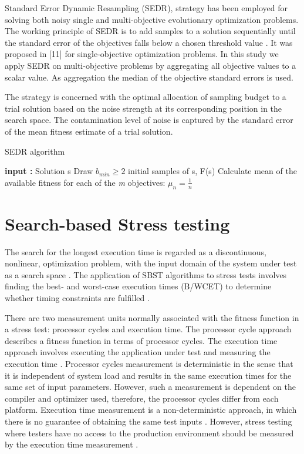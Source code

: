 \documentclass{report}
\begin{document}
Standard Error Dynamic Resampling (SEDR), strategy has been employed for solving both noisy single and multi-objective evolutionary
optimization problems. The working principle of SEDR is to add samples to a solution sequentially until the standard error of
the objectives falls below a chosen threshold value \cite{Siegmund2013}. It was proposed in [11] for single-objective optimization problems. In this study we apply SEDR on multi-objective problems by aggregating all objective values to a scalar value. As aggregation the median of the objective standard errors is used.


The strategy is concerned with the optimal allocation of sampling budget to a trial solution based on the noise strength at its corresponding position in the search space. The contamination level of noise is captured by the standard error of the mean fitness estimate of a trial solution. 


\begin{algorithm}[h]
  \caption{SEDR algorithm \cite{Siegmund2013}}\label{SEDR}
  \begin{algorithmic}[1]

    \State \textbf{input :} Solution s
    \State Draw $b_{min}\ge 2$ initial samples of s, F(s)
    \State Calculate mean of the available fitness for each of the \textit{m} objectives: $\mu_{n} = \frac{1}{n} $
  \end{algorithmic}
\end{algorithm}


\section{Search-based Stress testing}

The search for the longest execution time is regarded as a discontinuous, nonlinear, optimization problem, with the input domain of the system under test as a search space \cite{Sullivan}.  The application of SBST algorithms to  stress tests involves finding the best- and worst-case execution times (B/WCET) to determine whether timing constraints are fulfilled \cite{Afzal2009a}.

There are two measurement units normally associated with the fitness function in a stress test: processor cycles and execution time. The processor cycle approach describes a fitness function in terms of processor cycles. The execution time approach involves executing the application under test and measuring the execution time \cite{Afzal2009a} \cite{tracey2000search}. Processor cycles measurement is deterministic in the sense that it is independent of system load and results in the same execution times for the same set of input parameters. However, such a measurement is dependent on the compiler and optimizer used, therefore, the processor cycles differ from each platform. Execution time measurement is a non-deterministic approach, in which there is no guarantee of obtaining the same test inputs \cite{Afzal2009a}.  However, stress testing where testers have no access to the production environment should be measured by the execution time measurement \cite{Molyneaux2009} \cite{Afzal2009a}.
\end{document}
